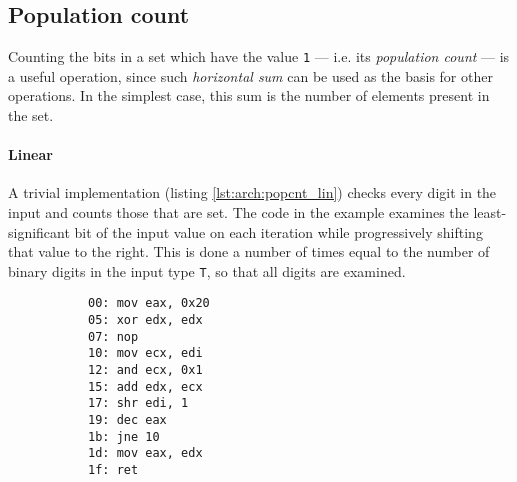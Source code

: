 \subsection{Population count}

\label{subsec:arch:popcnt}

Counting the bits in a set which have the value \texttt{1} --- i.e.  its
\textit{population count} --- is a useful operation, since such
\textit{horizontal sum} can be used as the basis for other operations.  In the
simplest case, this sum is the number of elements present in the
set\footnotemark.


\paragraph{Linear}

A trivial implementation (listing \ref{lst:arch:popcnt_lin}) checks every digit
in the input and counts those that are set.  The code in the example examines
the least-significant bit of the input value on each iteration while
progressively shifting that value to the right.  This is done a number of times
equal to the number of binary digits in the input type \texttt{T}, so that all
digits are examined.


\begin{figure}[ht]
    \vspace{-\baselineskip}
    \begin{subfigure}[t]{0.65\textwidth}
        
    \end{subfigure}
    \hspace*{\fill}
    \begin{subfigure}[t]{0.3\textwidth}
        \begin{lstlisting}[style=x86]
00: mov eax, 0x20
05: xor edx, edx
07: nop
10: mov ecx, edi
12: and ecx, 0x1
15: add edx, ecx
17: shr edi, 1
19: dec eax
1b: jne 10
1d: mov eax, edx
1f: ret
        \end{lstlisting}
    \end{subfigure}
    \vspace{-2\baselineskip}
\end{figure}

